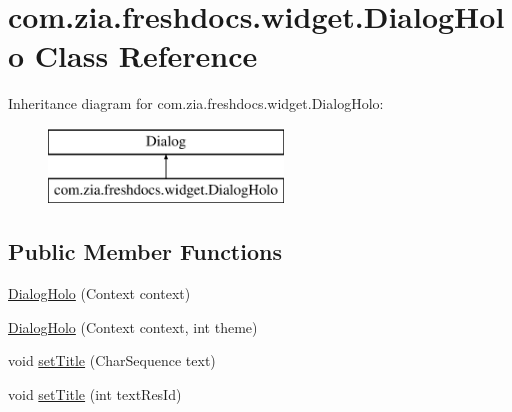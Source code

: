 \hypertarget{classcom_1_1zia_1_1freshdocs_1_1widget_1_1_dialog_holo}{\section{com.\-zia.\-freshdocs.\-widget.\-Dialog\-Holo Class Reference}
\label{classcom_1_1zia_1_1freshdocs_1_1widget_1_1_dialog_holo}
}
Inheritance diagram for com.\-zia.\-freshdocs.\-widget.\-Dialog\-Holo\-:\begin{figure}[H]
\begin{center}
\leavevmode
\includegraphics[height=2.000000cm]{classcom_1_1zia_1_1freshdocs_1_1widget_1_1_dialog_holo}
\end{center}
\end{figure}
\subsection*{Public Member Functions}
\begin{DoxyCompactItemize}
\item 
\hyperlink{classcom_1_1zia_1_1freshdocs_1_1widget_1_1_dialog_holo_a62010fbfe07bf1309be414d0d2035506}{Dialog\-Holo} (Context context)
\item 
\hyperlink{classcom_1_1zia_1_1freshdocs_1_1widget_1_1_dialog_holo_abb8dfdc29c9dc5d2e8bc7de94e1ef9eb}{Dialog\-Holo} (Context context, int theme)
\item 
void \hyperlink{classcom_1_1zia_1_1freshdocs_1_1widget_1_1_dialog_holo_a81437c83b06d8851eac83ba208211b7f}{set\-Title} (Char\-Sequence text)
\item 
void \hyperlink{classcom_1_1zia_1_1freshdocs_1_1widget_1_1_dialog_holo_a670a9ece6353429173c3b24b521059ff}{set\-Title} (int text\-Res\-Id)
\end{DoxyCompactItemize}


